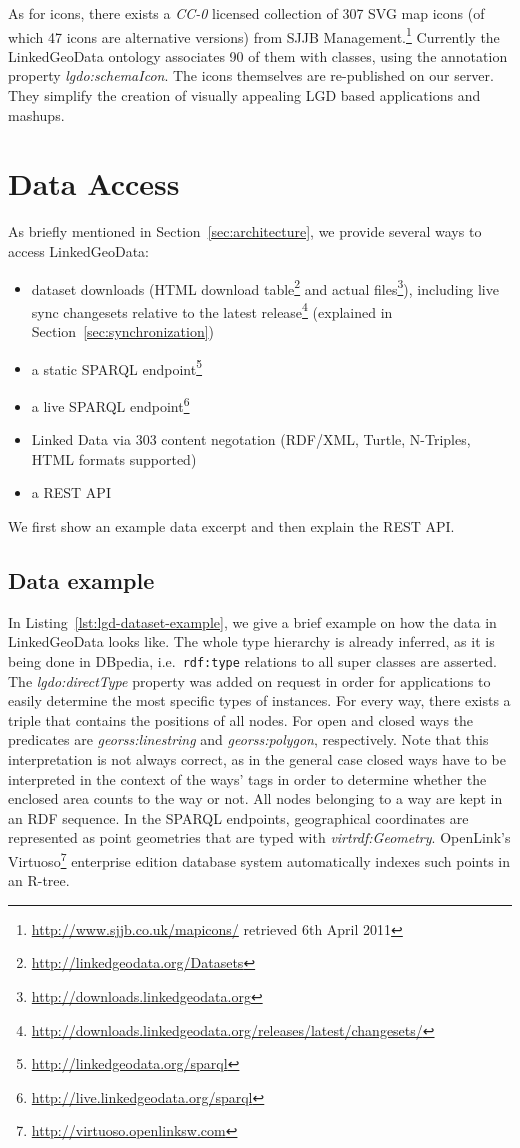 As for icons, there exists a \textit{CC-0} licensed collection of 307 SVG map
icons (of which 47 icons are alternative versions) from SJJB
Management.\footnote{\url{http://www.sjjb.co.uk/mapicons/} retrieved 6th April 2011}
Currently the LinkedGeoData ontology associates 90 of them with classes,
using the annotation property \emph{lgdo:schemaIcon}.
The icons themselves are re-published on our server. 
They simplify the creation of visually appealing LGD based applications and mashups.

\section{Data Access}
\label{sec:data_access}

As briefly mentioned in Section~\ref{sec:architecture}, we provide several ways to access LinkedGeoData:
\begin{itemize}
 \item dataset downloads (HTML download table\footnote{\url{http://linkedgeodata.org/Datasets}} and actual files\footnote{\url{http://downloads.linkedgeodata.org}}), including live sync changesets relative to the latest release\footnote{\url{http://downloads.linkedgeodata.org/releases/latest/changesets/}} (explained in Section~\ref{sec:synchronization})
 \item a static SPARQL endpoint\footnote{\url{http://linkedgeodata.org/sparql}}
 \item a live SPARQL endpoint\footnote{\url{http://live.linkedgeodata.org/sparql}}
 \item Linked Data via 303 content negotation (RDF/XML, Turtle, N-Triples, HTML formats supported)
 \item a REST API
\end{itemize}

We first show an example data excerpt and then explain the REST API.

\subsection{Data example}
In Listing~\ref{lst:lgd-dataset-example}, we give a brief example on how the data in LinkedGeoData looks like.
The whole type hierarchy is already inferred, as it is being done in DBpedia, i.e.~\verb|rdf:type| relations to all super classes are asserted.
The \emph{lgdo:directType} property was added on request in order for applications to easily determine the most specific types of instances.
For every way, there exists a triple that contains the positions of all nodes.
For open and closed ways the predicates are \emph{georss:linestring} and \emph{georss:polygon}, respectively.
Note that this interpretation is not always correct, as in the general case closed ways have to be interpreted in the context of the ways' tags in order to determine whether the enclosed area counts to the way or not.
All nodes belonging to a way are kept in an RDF sequence.
In the SPARQL endpoints, geographical coordinates are represented as point geometries that are typed with \emph{virtrdf:Geometry}.
OpenLink's Virtuoso\footnote{\url{http://virtuoso.openlinksw.com}} enterprise
edition database system automatically indexes such points in an R-tree.

